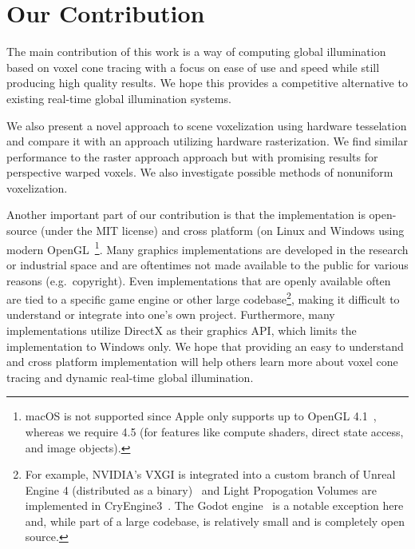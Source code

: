 \section{Our Contribution}
The main contribution of this work is a way of computing global illumination based on voxel cone tracing with a focus on ease of use and speed while still producing high quality results. We hope this provides a competitive alternative to existing real-time global illumination systems.

 We also present a novel approach to scene voxelization using hardware tesselation and compare it with an approach utilizing hardware rasterization. We find similar performance to the raster approach approach but with promising results for perspective warped voxels. We also investigate possible methods of nonuniform voxelization.


Another important part of our contribution is that the implementation is open-source (under the MIT license) and cross platform (on Linux and Windows using modern OpenGL~\footnote{macOS is not supported since Apple only supports up to OpenGL 4.1~\cite{appleopenglsupport}, whereas we require 4.5 (for features like compute shaders, direct state access, and image objects).}. Many graphics implementations are developed in the research or industrial space and are oftentimes not made available to the public for various reasons (e.g.\ copyright). Even implementations that are openly available often are tied to a specific game engine or other large codebase\footnote{For example, NVIDIA's VXGI is integrated into a custom branch of Unreal Engine 4 (distributed as a binary)~\cite{nvidiavxgi} and Light Propogation Volumes are implemented in CryEngine3~\cite{kaplanyan2009light}. The Godot engine~\cite{godotengine} is a notable exception here and, while part of a large codebase, is relatively small and is completely open source.}, making it difficult to understand or integrate into one's own project. Furthermore, many implementations utilize DirectX as their graphics API, which limits the implementation to Windows only. We hope that providing an easy to understand and cross platform implementation will help others learn more about voxel cone tracing and dynamic real-time global illumination.
